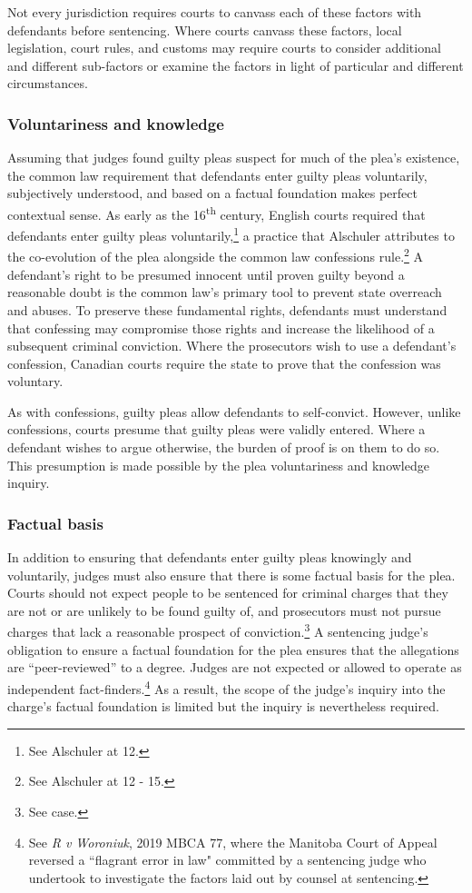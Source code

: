 Not every jurisdiction requires courts to canvass each of these factors with defendants before sentencing. Where courts canvass these factors, local legislation, court rules, and customs may require courts to consider additional and different sub-factors or examine the factors in light of particular and different circumstances. 

\subsubsection{Voluntariness and knowledge}

Assuming that judges found guilty pleas suspect for much of the plea's existence, the common law requirement that defendants enter guilty pleas voluntarily, subjectively understood, and based on a factual foundation makes perfect contextual sense. As early as the 16\textsuperscript{th} century, English courts required that defendants enter guilty pleas voluntarily,\footnote{See Alschuler at 12.} a practice that Alschuler attributes to the co-evolution of the plea alongside the common law confessions rule.\footnote{See Alschuler at 12 - 15.} A defendant's right to be presumed innocent until proven guilty beyond a reasonable doubt is the common law's primary tool to prevent state overreach and abuses. To preserve these fundamental rights, defendants must understand that confessing may compromise those rights and increase the likelihood of a subsequent criminal conviction. Where the prosecutors wish to use a defendant's confession, Canadian courts require the state to prove that the confession was voluntary. 

As with confessions, guilty pleas allow defendants to self-convict. However, unlike confessions, courts presume that guilty pleas were validly entered. Where a defendant wishes to argue otherwise, the burden of proof is on them to do so. This presumption is made possible by the plea voluntariness and knowledge inquiry.

\subsubsection{Factual basis}

In addition to ensuring that defendants enter guilty pleas knowingly and voluntarily, judges must also ensure that there is some factual basis for the plea. Courts should not expect people to be sentenced for criminal charges that they are not or are unlikely to be found guilty of, and prosecutors must not pursue charges that lack a reasonable prospect of conviction.\footnote{See case.} A sentencing judge's obligation to ensure a factual foundation for the plea ensures that the allegations are ``peer-reviewed'' to a degree. Judges are not expected or allowed to operate as independent fact-finders.\footnote{See \textit{R v Woroniuk}, 2019 MBCA 77, where the Manitoba Court of Appeal reversed a ``flagrant error in law" committed by a sentencing judge who undertook to investigate the factors laid out by counsel at sentencing.} As a result, the scope of the judge's inquiry into the charge's factual foundation is limited but the inquiry is nevertheless required.

